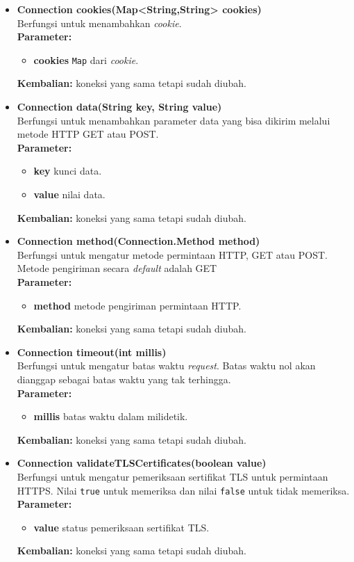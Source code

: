 \begin{itemize}
	\item \textbf{Connection cookies(Map<String,String> cookies)} \\
		Berfungsi untuk menambahkan \textit{cookie}. \\
		\textbf{Parameter:}
		\begin{itemize}
			\item \textbf{cookies} \texttt{Map} dari \textit{cookie}.
		\end{itemize}
		\textbf{Kembalian:} koneksi yang sama tetapi sudah diubah.
		
		\item \textbf{Connection data(String key, String value)} \\
		Berfungsi untuk menambahkan parameter data yang bisa dikirim melalui metode HTTP GET atau POST. \\
		\textbf{Parameter:}
		\begin{itemize}
			\item \textbf{key} kunci data.
			\item \textbf{value} nilai data.
		\end{itemize}
		\textbf{Kembalian:} koneksi yang sama tetapi sudah diubah.
		
		\item \textbf{Connection method(Connection.Method method)} \\
		Berfungsi untuk mengatur metode permintaan HTTP, GET atau POST. Metode pengiriman secara \textit{default} adalah GET\\
		\textbf{Parameter:}
		\begin{itemize}
			\item \textbf{method} metode pengiriman permintaan HTTP.
		\end{itemize}
		\textbf{Kembalian:} koneksi yang sama tetapi sudah diubah.
		
		\item \textbf{Connection timeout(int millis)} \\
		Berfungsi untuk mengatur batas waktu \textit{request}. Batas waktu nol akan dianggap sebagai batas waktu yang tak terhingga. \\
		\textbf{Parameter:}
		\begin{itemize}
			\item \textbf{millis} batas waktu dalam milidetik.
		\end{itemize}
		\textbf{Kembalian:} koneksi yang sama tetapi sudah diubah.
		
		\item \textbf{Connection validateTLSCertificates(boolean value)} \\
		Berfungsi untuk mengatur pemeriksaan sertifikat TLS untuk permintaan HTTPS. Nilai \texttt{true} untuk memeriksa dan nilai \texttt{false} untuk tidak memeriksa.\\
		\textbf{Parameter:}
		\begin{itemize}
			\item \textbf{value} status pemeriksaan sertifikat TLS.
		\end{itemize}
		\textbf{Kembalian:} koneksi yang sama tetapi sudah diubah.
		

\end{itemize}
